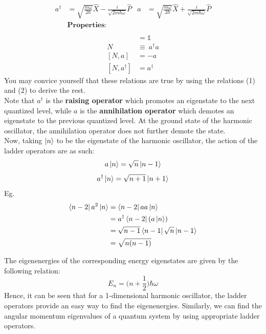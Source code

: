 \documentclass{article}
\begin{document}
\begin{flushleft}
\begin{align*}
    a^\dagger&=\sqrt{\frac{m\omega}{2\hbar}}\hat{X}-\frac{i}{\sqrt{2m\hbar\omega}}\hat{P} &
    a&=\sqrt{\frac{m\omega}{2\hbar}}\hat{X}+\frac{i}{\sqrt{2m\hbar\omega}}\hat{P}\\[0.5cm]
    &\textbf{Properties:}\\
\end{align*}
\begin{align}
    [a,a^\dagger]&=\mathbb{1}\\
    N&\equiv \ a^\dagger a\\
    [N,a]&=-a\\
    [N,a^\dagger]&=a^\dagger
\end{align}
You may convice yourself that these relations are true by using the relations (1) and (2) to derive the rest.\\
Note that $a^\dagger$ is the \textbf{raising operator} which promotes an eigenstate to the next quantized level, while $a$ is the \textbf{annihilation operator} which demotes an eigenstate to the previous quantized level. At the ground state of the harmonic oscillator, the annihilation operator does not further demote the state.\\[0.5cm]
Now, taking $\ket{n}$ to be the  eigenstate of the harmonic oscillator, the action of the ladder operators are as such:
$$a\ket{n}=\sqrt{n}\ket{n-1}$$
$$a^\dagger\ket{n}=\sqrt{n+1}\ket{n+1}$$
Eg.
\begin{align*}
\bra{n-2}a^2\ket{n}&=\bra{n-2}aa\ket{n}\\
&=a^\dagger\bra{n-2}(a\ket{n})\\
&=\sqrt{n-1}\bra{n-1}\sqrt{n}\ket{n-1}\\
&=\sqrt{n(n-1)}
    \end{align*}

The eigenenergies of the corresponding energy eigenstates are given by the following relation:
$$E_n=\bigg(n+\frac{1}{2}\bigg)\hbar\omega$$
Hence, it can be seen that for a 1-dimensional harmonic oscillator, the ladder operators provide an easy way to find the eigenenergies. Similarly, we can find the angular momentum eigenvalues of a quantum system by using appropriate ladder operators.


\end{flushleft}
\end{document}

